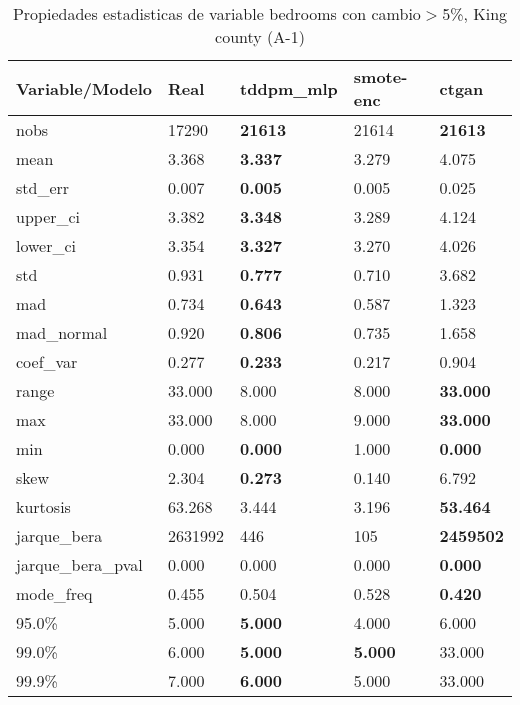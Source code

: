 \begin{table}[H]
\centering
\fontsize{8}{14}\selectfont
\caption{Propiedades estadisticas de variable bedrooms con cambio\ensuremath{>}5\%, King county (A-1)}
\label{table-stats-king county-a-1-bedrooms-short}
\begin{tabular}{|l|m{10em}|m{10em}|m{10em}|m{10em}|}
\hline
 \rowcolor[gray]{0.8}
Variable/Modelo & Real & tddpm\_mlp & smote-enc & ctgan \\
\hline nobs & 17290 & \bfseries 21613 & \cellcolor[rgb]{0.9, 0.54, 0.52} 21614 & \bfseries 21613 \\
\hline mean & 3.368 & \bfseries 3.337 & 3.279 & \cellcolor[rgb]{0.9, 0.54, 0.52} 4.075 \\
\hline std\_err & 0.007 & \bfseries 0.005 & 0.005 & \cellcolor[rgb]{0.9, 0.54, 0.52} 0.025 \\
\hline upper\_ci & 3.382 & \bfseries 3.348 & 3.289 & \cellcolor[rgb]{0.9, 0.54, 0.52} 4.124 \\
\hline lower\_ci & 3.354 & \bfseries 3.327 & 3.270 & \cellcolor[rgb]{0.9, 0.54, 0.52} 4.026 \\
\hline std & 0.931 & \bfseries 0.777 & 0.710 & \cellcolor[rgb]{0.9, 0.54, 0.52} 3.682 \\
\hline mad & 0.734 & \bfseries 0.643 & 0.587 & \cellcolor[rgb]{0.9, 0.54, 0.52} 1.323 \\
\hline mad\_normal & 0.920 & \bfseries 0.806 & 0.735 & \cellcolor[rgb]{0.9, 0.54, 0.52} 1.658 \\
\hline coef\_var & 0.277 & \bfseries 0.233 & 0.217 & \cellcolor[rgb]{0.9, 0.54, 0.52} 0.904 \\
\hline range & 33.000 & \cellcolor[rgb]{0.9, 0.54, 0.52} 8.000 & \cellcolor[rgb]{0.9, 0.54, 0.52} 8.000 & \bfseries 33.000 \\
\hline max & 33.000 & \cellcolor[rgb]{0.9, 0.54, 0.52} 8.000 & 9.000 & \bfseries 33.000 \\
\hline min & 0.000 & \bfseries 0.000 & \cellcolor[rgb]{0.9, 0.54, 0.52} 1.000 & \bfseries 0.000 \\
\hline skew & 2.304 & \bfseries 0.273 & 0.140 & \cellcolor[rgb]{0.9, 0.54, 0.52} 6.792 \\
\hline kurtosis & 63.268 & 3.444 & \cellcolor[rgb]{0.9, 0.54, 0.52} 3.196 & \bfseries 53.464 \\
\hline jarque\_bera & 2631992 & 446 & \cellcolor[rgb]{0.9, 0.54, 0.52} 105 & \bfseries 2459502 \\
\hline jarque\_bera\_pval & 0.000 & 0.000 & \cellcolor[rgb]{0.9, 0.54, 0.52} 0.000 & \bfseries 0.000 \\
\hline mode\_freq & 0.455 & 0.504 & \cellcolor[rgb]{0.9, 0.54, 0.52} 0.528 & \bfseries 0.420 \\
\hline 95.0\% & 5.000 & \bfseries 5.000 & \cellcolor[rgb]{0.9, 0.54, 0.52} 4.000 & \cellcolor[rgb]{0.9, 0.54, 0.52} 6.000 \\
\hline 99.0\% & 6.000 & \bfseries 5.000 & \bfseries 5.000 & \cellcolor[rgb]{0.9, 0.54, 0.52} 33.000 \\
\hline 99.9\% & 7.000 & \bfseries 6.000 & 5.000 & \cellcolor[rgb]{0.9, 0.54, 0.52} 33.000 \\
\hline
\end{tabular}
\end{table}
